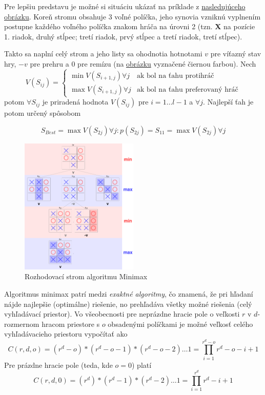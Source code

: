 Pre lepšiu predstavu je možné si situáciu ukázať na príklade z \hyperref[figure:minimax-tree]{nasledujúceho obrázku}.
Koreň stromu obsahuje 3 voľné políčka, jeho synovia vzniknú vyplnením postupne každého voľného políčka znakom hráča na
úrovni 2 (tzn. \textbf{X} na pozície 1. riadok, druhý stĺpec; tretí riadok, prvý stĺpec a tretí riadok, tretí stĺpec).

Takto sa naplní celý strom a jeho listy sa ohodnotia hotnotami $v$ pre víťazný stav hry, $-v$ pre prehru a $0$ pre
remízu (na \hyperref[figure:minimax-tree]{obrázku} vyznačené čiernou farbou).
Nech
\begin{equation}
    V(S_{ij}) =
    \begin{cases}
        \min{V(S_{i+1,j}) \forall j} & \text{ak bol na ťahu protihráč} \\
        \max{V(S_{i+1,j}) \forall j} & \text{ak bol na ťahu preferovaný hráč}
    \end{cases}
\end{equation}
potom $\forall S_{ij}$ je priradená hodnota $V(S_{ij})$ pre $i = 1 \dots l-1$ a $\forall j$.
Najlepší ťah je potom určený spôsobom

\begin{equation}
    S_{Best} = \max{V(S_{2j}) \forall j \colon p(S_{2j}) = S_{11}} = \max{V(S_{2j}) \forall j}
\end{equation}

\begin{figure}[H]
    \centering
    \includegraphics[width=0.5\textwidth]{images/minmax-tree.png}
    \caption{Rozhodovací strom algoritmu Minimax}
\end{figure}\label{figure:minimax-tree}

Algoritmus minimax patrí medzi \emph{exaktné algoritmy}, čo znamená, že pri hľadaní nájde najlepšie (optimálne)
riešenie, no prehľadáva všetky možné riešenia (celý vyhľadávací priestor).
Vo všeobecnosti pre neprázdne hracie pole o veľkosti $r$ v $d$-rozmernom hracom priestore s $o$ obsadenými políčkami je
možné veľkosť celého vyhľadávacieho priestoru vypočítať ako
\begin{equation}
    C(r, d, o) = (r^d - o) * (r^d - o - 1) * (r^d - o - 2) \dots 1 = \prod_{i = 1}^{r^d - o}{r^d - o - i + 1}
\end{equation}
Pre prázdne hracie pole (teda, kde $o = 0$) platí
\begin{equation}
    C(r, d, 0) = (r^d) * (r^d - 1) * (r^d - 2) \dots 1 = \prod_{i = 1}^{r^d}{r^d - i + 1}
\end{equation}

